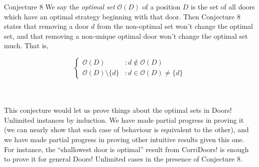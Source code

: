 \documentclass[final]{beamer}
\begin{document}
\begin{columns}[t]
\begin{column}{.3 \linewidth}
\begin{block}{Conjecture 8}
We say the \emph{optimal set} $\mathcal{O}(D)$ of a position $D$ is the set of all doors which have an optimal strategy beginning with that door.
Then Conjecture 8 states that removing a door $d$ from the non-optimal set won't change the optimal set, and that removing a non-unique optimal door won't change the optimal set much.
That is,

\vspace{\baselineskip}

\[ \begin{cases} 
      \mathcal{O}(D) & : \text{$d \not \in \mathcal{O}(D)$} \\
      \mathcal{O}(D) \setminus \{ d \} & : \text{$d \in \mathcal{O}(D) \not = \{ d \}$}
   \end{cases}
\] \\~\\

\vspace{\baselineskip}

This conjecture would let us prove things about the optimal sets in Doors! Unlimited instances by induction.
We have made partial progress in proving it (we can nearly show that each case of behaviour is equivalent to the other), and we have made partial progress in proving other intuitive results given this one.
For instance, the ``shallowest door is optimal'' result from CorriDoors! is enough to prove it for general Doors! Unlimited cases in the presence of Conjecture 8.

\end{block}
\vspace{\baselineskip}

\end{column}

\end{columns}
\end{document}
